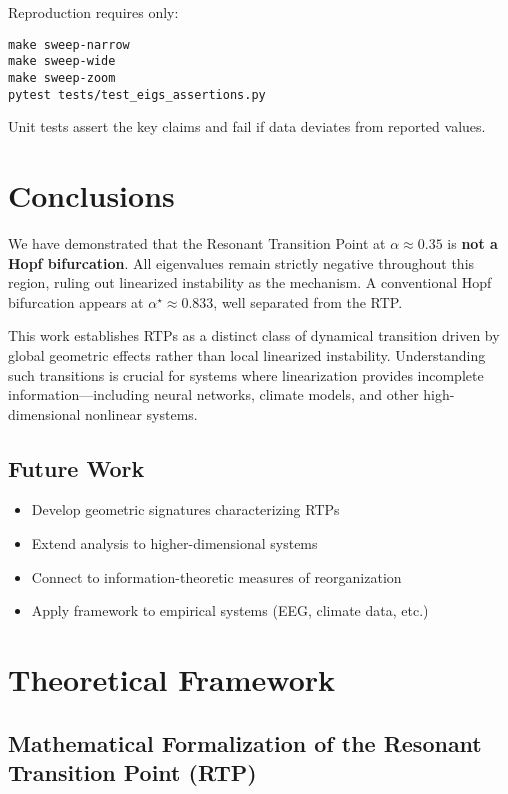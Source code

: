 \documentclass[11pt,twocolumn]{article}
\begin{document}
Reproduction requires only:
\begin{verbatim}
make sweep-narrow
make sweep-wide
make sweep-zoom
pytest tests/test_eigs_assertions.py
\end{verbatim}

Unit tests assert the key claims and fail if data deviates from reported values.

\section{Conclusions}

We have demonstrated that the Resonant Transition Point at $\alpha \approx 0.35$ is \textbf{not a Hopf
bifurcation}. All eigenvalues remain strictly negative throughout this region, ruling out linearized instability
as the mechanism. A conventional Hopf bifurcation appears at $\alpha^\star \approx 0.833$, well separated from
the RTP.

This work establishes RTPs as a distinct class of dynamical transition driven by global geometric effects rather
than local linearized instability. Understanding such transitions is crucial for systems where linearization
provides incomplete information—including neural networks, climate models, and other high-dimensional nonlinear
systems.

\subsection{Future Work}

\begin{itemize}
  \item Develop geometric signatures characterizing RTPs
  \item Extend analysis to higher-dimensional systems
  \item Connect to information-theoretic measures of reorganization
  \item Apply framework to empirical systems (EEG, climate data, etc.)
\end{itemize}

\section{Theoretical Framework}

\subsection{Mathematical Formalization of the Resonant Transition Point (RTP)}
\label{sec:rtp-formal}
\end{document}
